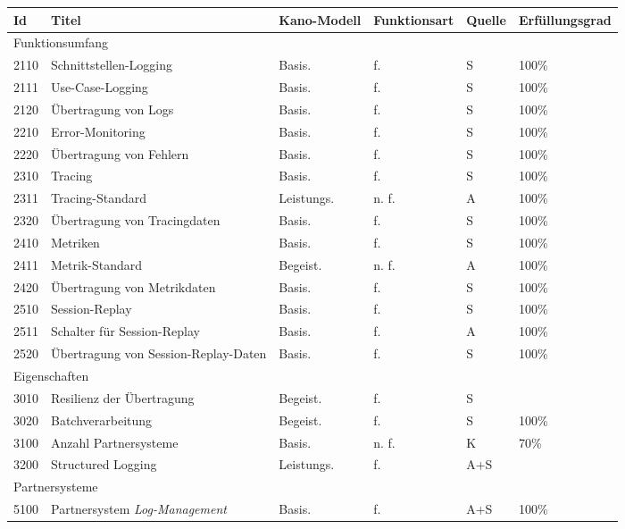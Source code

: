 \begingroup
\centering
\setlength{\LTleft}{-20cm plus -1fill}
\setlength{\LTright}{\LTleft}
\begin{longtable}{|p{0.85cm}|p{6.2cm}|p{1.55cm}|p{1.75cm}|p{1.1cm}|p{1.8cm}|}
\hline
Id & Titel & Kano-Modell & Funktions\-art & Quelle & Erfüllungs\-grad \\
\endhead
\hline
\multicolumn{6}{|l|}{Funktionsumfang} \\
\hline
2110 & Schnittstellen-Logging & Basis. & f. & S & 100\% \\
\hline
2111 & Use-Case-Logging & Basis. & f. & S & 100\% \\
\hline
2120 & Übertragung von Logs & Basis. & f. & S & 100\% \\
\hline
2210 & Error-Monitoring & Basis. & f. & S & 100\% \\
\hline
2220 & Übertragung von Fehlern & Basis. & f. & S & 100\% \\
\hline
2310 & Tracing & Basis. & f. & S & 100\% \\
\hline
2311 & Tracing-Standard & Leistungs. & n. f. & A & 100\% \\
\hline
2320 & Übertragung von Tracingdaten & Basis. & f. & S & 100\% \\
\hline
2410 & Metriken & Basis. & f. & S & 100\% \\
\hline
2411 & Metrik-Standard & Begeist. & n. f. & A & 100\% \\
\hline
2420 & Übertragung von Metrikdaten & Basis. & f. & S & 100\% \\
\hline
2510 & Session-Replay & Basis. & f. & S & 100\% \\
\hline
2511 & Schalter für Session-Replay & Basis. & f. & A & 100\% \\
\hline
2520 & Übertragung von Session-Replay-Daten & Basis. & f. & S & 100\% \\
\hline
\multicolumn{6}{|l|}{Eigenschaften} \\
\hline
3010 & Resilienz der Übertragung & Begeist. & f. & S &  \\
\hline
3020 & Batchverarbeitung & Begeist. & f. & S & 100\% \\
\hline
3100 & Anzahl Partnersysteme & Basis. & n. f. & K & 70\% \\
\hline
3200 & Structured Logging & Leistungs. & f. & A+S &  \\
\hline
\multicolumn{6}{|l|}{Partnersysteme} \\
\hline
5100 & Partnersystem \textit{Log-Management} & Basis. & f. & A+S & 100\% \\

\end{longtable}
